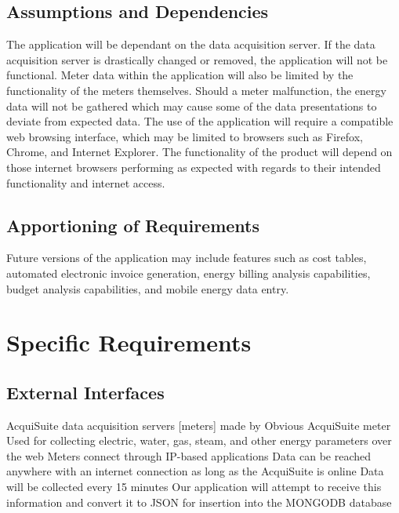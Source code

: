 \documentclass[onecolumn, draftclsnofoot,10pt, compsoc]{IEEEtran}
\begin{document}
\begin{enumerate}
    \subsection{Assumptions and Dependencies}
    The application will be dependant on the data acquisition server. If the data acquisition server is drastically changed or removed, the application will not be functional. Meter data within the application will also be limited by the functionality of the meters themselves. Should a meter malfunction, the energy data will not be gathered which may cause some of the data presentations to deviate from expected data. The use of the application will require a compatible web browsing interface, which may be limited to browsers such as Firefox, Chrome, and Internet Explorer. The functionality of the product will depend on those internet browsers performing as expected with regards to their intended functionality and internet access. 

    \subsection{Apportioning of Requirements}
    Future versions of the application may include features such as cost tables, automated electronic invoice generation, energy billing analysis capabilities, budget analysis capabilities, and mobile energy data entry.
    
    \section{Specific Requirements}
    
    \subsection{External Interfaces}
    AcquiSuite data acquisition servers [meters] made by Obvious
    AcquiSuite meter
    Used for collecting electric, water, gas, steam, and other energy parameters over the web
    Meters connect through IP-based applications
    Data can be reached anywhere with an internet connection as long as the AcquiSuite is online
    Data will be collected every 15 minutes
    Our application will attempt to receive this information and convert it to JSON for insertion into the MONGODB database
    
    

\end{enumerate}
\end{document}
